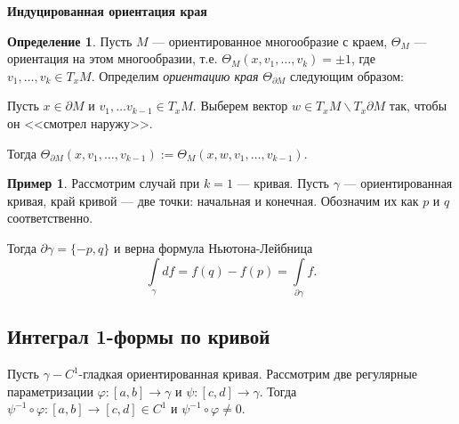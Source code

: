 \documentclass[a5paper]{article}
\newcounter{through}
\theoremstyle{plain}
\theoremstyle{definition}
\newtheorem{definition}[through]{Определение}
\newtheorem{example}[through]{Пример}
\numberwithin{through}{section}
\numberwithin{equation}{section}
\begin{document}
\medskip

\textbf{Индуцированная ориентация края}

\begin{definition}\label{OrientationManifoldInd}
	Пусть $M$ --- ориентированное многообразие с краем, $\Theta_M$ --- ориентация на этом многообразии, т.е. 
	$ \Theta_M(x, v_1,\ldots, v_k) = \pm 1$, где $v_1,\ldots, v_k \in T_x M$.
	Определим \textit{ориентацию края} $\Theta_{\partial M}$ следующим образом:
	
	Пусть $x \in \partial M$ и $v_1,\ldots v_{k-1} \in T_xM$. Выберем вектор $w \in T_x M \backslash T_x \partial M$ так, чтобы он
	<<смотрел наружу>>. 
	
	Тогда $\Theta_{\partial M}(x, v_1,\ldots, v_{k-1}) := \Theta_M(x, w, v_1,\ldots, v_{k-1})$.
\end{definition}

\begin{example}
	Рассмотрим случай при $k = 1$ --- кривая. Пусть $\gamma$ --- ориентированная кривая, край кривой --- две точки: начальная и конечная.
	Обозначим их как $p$ и $q$ соответственно.
	
	\begin{center}
	\end{center}  
	
	Тогда $\partial \gamma = \{ -p, q \}$ и верна формула Ньютона-Лейбница
	\[ \int\limits_{\gamma} df = f(q) - f(p) = \int\limits_{\partial \gamma} f. \]
\end{example}




\subsection{Интеграл 1-формы по кривой} %

Пусть $\gamma - C^1$-гладкая ориентированная кривая. Рассмотрим две регулярные параметризации $\varphi:
[a, b] \to \gamma$ и $\psi: [c, d] \to \gamma$. Тогда $\psi^{-1} \circ \varphi : [a, b] \to [c, d] \in C^1$ и $\psi^{-1} \circ \varphi \not= 0$.
\end{document}
